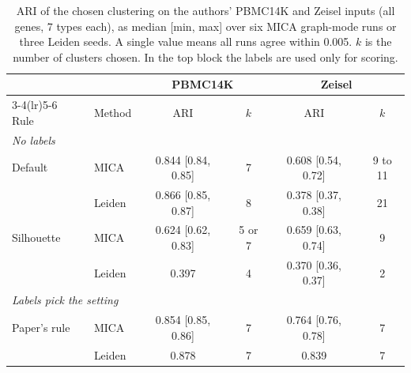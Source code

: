 \begin{table}[t]
\centering
\caption{ARI of the chosen clustering on the authors' PBMC14K and Zeisel inputs (all genes, 7 types each), as median [min, max] over six MICA graph-mode runs or three Leiden seeds. A single value means all runs agree within 0.005. $k$ is the number of clusters chosen. In the top block the labels are used only for scoring.}
\label{tab:selection}
\scriptsize
\setlength{\tabcolsep}{1.7pt}
\begin{tabular}{llcccc}
\toprule
 & & \multicolumn{2}{c}{PBMC14K} & \multicolumn{2}{c}{Zeisel} \\
\cmidrule(lr){3-4}\cmidrule(lr){5-6}
Rule & Method & ARI & $k$ & ARI & $k$ \\
\midrule
\multicolumn{6}{l}{\textit{No labels}} \\
Default & MICA & 0.844 [0.84, 0.85] & 7 & 0.608 [0.54, 0.72] & 9 to 11 \\
 & Leiden & 0.866 [0.85, 0.87] & 8 & 0.378 [0.37, 0.38] & 21 \\
Silhouette & MICA & 0.624 [0.62, 0.83] & 5 or 7 & 0.659 [0.63, 0.74] & 9 \\
 & Leiden & 0.397 & 4 & 0.370 [0.36, 0.37] & 2 \\
\midrule
\multicolumn{6}{l}{\textit{Labels pick the setting}} \\
Paper's rule & MICA & 0.854 [0.85, 0.86] & 7 & 0.764 [0.76, 0.78] & 7 \\
 & Leiden & 0.878 & 7 & 0.839 & 7 \\
\bottomrule
\end{tabular}
\end{table}
